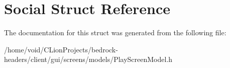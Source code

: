 \hypertarget{struct_social}{}\section{Social Struct Reference}
\label{struct_social}


The documentation for this struct was generated from the following file\+:\begin{DoxyCompactItemize}
\item 
/home/void/\+C\+Lion\+Projects/bedrock-\/headers/client/gui/screens/models/Play\+Screen\+Model.\+h\end{DoxyCompactItemize}
